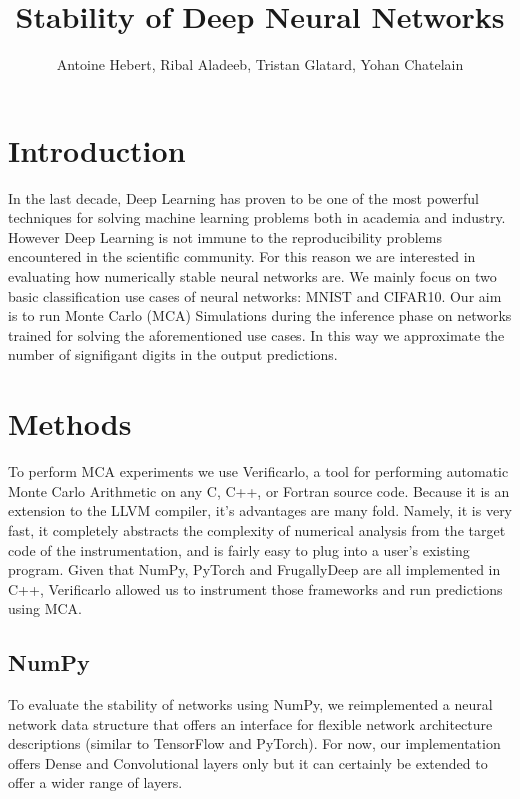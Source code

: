 \documentclass[a4paper,12pt]{article}
\begin{document}
\title{Stability of Deep Neural Networks}
\author{Antoine Hebert, Ribal Aladeeb, Tristan Glatard, Yohan Chatelain}
\maketitle
\section{Introduction}

In the last decade, Deep Learning has proven to be one of the most
powerful techniques for solving machine learning problems both in academia
and industry. However Deep Learning is not immune to the reproducibility
problems encountered in the scientific community. For this reason we are
interested in evaluating how numerically stable neural networks are. We
mainly focus on two basic classification use cases of neural networks: MNIST
and CIFAR10. Our aim is to run Monte Carlo (MCA) Simulations during the inference
phase on networks trained for solving the aforementioned use cases. In this
way we approximate the number of signifigant digits in the output
predictions.

\section{Methods}

To perform MCA experiments we use Verificarlo, a tool for performing
automatic Monte Carlo Arithmetic on any C, C++, or Fortran source code.
Because it is an extension to the LLVM compiler, it's advantages are many
fold. Namely, it is very fast, it completely abstracts the complexity of
numerical analysis from the target code of the instrumentation, and is fairly
easy to plug into a user's existing program. Given that NumPy, PyTorch and
FrugallyDeep are all implemented in C++, Verificarlo allowed us to
instrument those frameworks and run predictions using MCA.

\subsection{NumPy}
To evaluate the stability of networks using NumPy, we reimplemented a neural
network data structure that offers an interface for flexible network
architecture descriptions (similar to TensorFlow and PyTorch). For now, our
implementation offers Dense and Convolutional layers only but it can certainly
be extended to offer a wider range of layers. 
\end{document}
